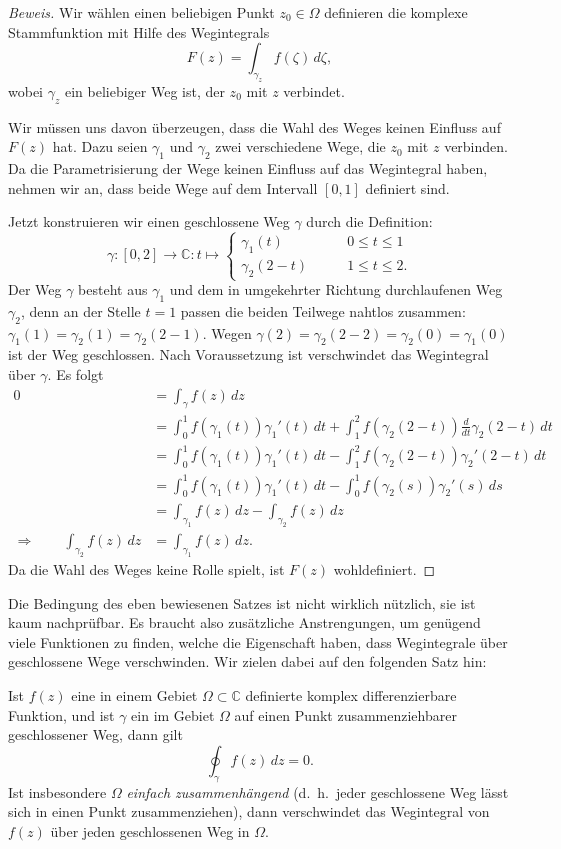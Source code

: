 \begin{proof}[Beweis]
Wir wählen einen beliebigen Punkt $z_0\in\Omega$ definieren die
komplexe Stammfunktion mit Hilfe des Wegintegrals
\[
F(z)=\int_{\gamma_z} f(\zeta)\,d\zeta,
\]
wobei $\gamma_z$ ein beliebiger Weg ist, der $z_0$ mit $z$ verbindet.

Wir müssen uns davon überzeugen, dass die Wahl des Weges keinen Einfluss
auf $F(z)$ hat.
Dazu seien $\gamma_1$ und $\gamma_2$ zwei verschiedene Wege, die
$z_0$ mit $z$ verbinden.
Da die Parametrisierung der Wege keinen Einfluss auf das Wegintegral haben,
nehmen wir an, dass beide Wege auf dem Intervall $[0,1]$ definiert sind.

Jetzt konstruieren wir einen geschlossene Weg $\gamma$ durch die
Definition:
\[
\gamma\colon[0,2]\to\mathbb C:t\mapsto
\begin{cases}
\gamma_1(t)&\qquad 0\le t\le 1\\
\gamma_2(2-t)&\qquad 1\le t\le 2.
\end{cases}
\]
Der Weg $\gamma$ besteht aus $\gamma_1$ und dem in umgekehrter Richtung
durchlaufenen Weg $\gamma_2$, denn an der Stelle $t=1$ passen die
beiden Teilwege nahtlos zusammen: $\gamma_1(1)=\gamma_2(1)=\gamma_2(2-1)$.
Wegen $\gamma(2)=\gamma_2(2-2)=\gamma_2(0)=\gamma_1(0)$ ist der
Weg geschlossen.
Nach Voraussetzung ist verschwindet das Wegintegral über $\gamma$.
Es folgt
\begin{align*}
0
&=
\int_{\gamma}f(z)\,dz
\\
&=
\int_0^1 f(\gamma_1(t))\gamma_1'(t)\,dt
+ \int_1^2f(\gamma_2(2-t))\frac{d}{dt}\gamma_2(2-t)\,dt
\\
&=
\int_0^1 f(\gamma_1(t))\gamma_1'(t)\,dt
- \int_1^2f(\gamma_2(2-t))\gamma_2'(2-t)\,dt
\\
&=
\int_0^1 f(\gamma_1(t))\gamma_1'(t)\,dt
- \int_0^1f(\gamma_2(s))\gamma_2'(s)\,ds
\\
&=
\int_{\gamma_1}f(z)\,dz - \int_{\gamma_2}f(z)\,dz
\\
\Rightarrow\qquad
\int_{\gamma_2}f(z)\,dz&=\int_{\gamma_1}f(z)\,dz.
\end{align*}
Da die Wahl des Weges keine Rolle spielt, ist $F(z)$ wohldefiniert.
\end{proof}

Die Bedingung des eben bewiesenen Satzes ist nicht wirklich nützlich,
sie ist kaum nachprüfbar.
Es braucht also zusätzliche Anstrengungen, um genügend viele
Funktionen zu finden, welche die Eigenschaft haben, dass Wegintegrale
über geschlossene Wege verschwinden.
Wir zielen dabei auf den folgenden Satz hin:
\begin{satz}[Cauchy]
Ist $f(z)$ eine in einem Gebiet $\Omega\subset\mathbb C$ definierte
komplex differenzierbare Funktion, und ist $\gamma$ ein im Gebiet
$\Omega$ auf einen Punkt zusammenziehbarer geschlossener Weg, dann gilt
\[
\oint_{\gamma}f(z)\,dz=0.
\]
Ist insbesondere $\Omega$ {\em einfach zusammenhängend}
%
%
(d.~h.~jeder geschlossene Weg lässt sich in einen Punkt zusammenziehen),
dann verschwindet das Wegintegral von $f(z)$ über jeden geschlossenen
Weg in $\Omega$.
\end{satz}


